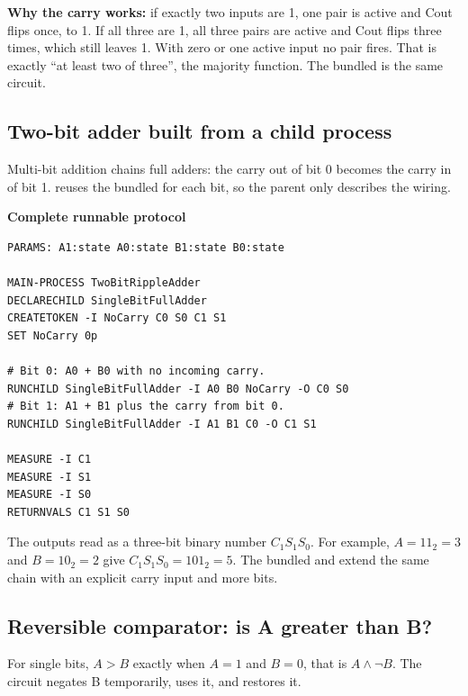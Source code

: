 \textbf{Why the carry works:} if exactly two inputs are 1, one pair is active
and Cout flips once, to 1. If all three are 1, all three pairs are active and
Cout flips three times, which still leaves 1. With zero or one active input no
pair fires. That is exactly ``at least two of three'', the majority function.
The bundled  is the same circuit.

\subsection{Two-bit adder built from a child process}

Multi-bit addition chains full adders: the carry out of bit 0 becomes the
carry in of bit 1.  reuses the bundled 
for each bit, so the parent only describes the wiring.

\textbf{Complete runnable protocol}
\begin{lstlisting}
PARAMS: A1:state A0:state B1:state B0:state

MAIN-PROCESS TwoBitRippleAdder
DECLARECHILD SingleBitFullAdder
CREATETOKEN -I NoCarry C0 S0 C1 S1
SET NoCarry 0p

# Bit 0: A0 + B0 with no incoming carry.
RUNCHILD SingleBitFullAdder -I A0 B0 NoCarry -O C0 S0
# Bit 1: A1 + B1 plus the carry from bit 0.
RUNCHILD SingleBitFullAdder -I A1 B1 C0 -O C1 S1

MEASURE -I C1
MEASURE -I S1
MEASURE -I S0
RETURNVALS C1 S1 S0
\end{lstlisting}

The outputs read as a three-bit binary number $C_1S_1S_0$. For example,
$A=11_2=3$ and $B=10_2=2$ give $C_1S_1S_0=101_2=5$. The bundled
 and  extend the same chain with
an explicit carry input and more bits.

\subsection{Reversible comparator: is A greater than B?}

For single bits, $A>B$ exactly when $A=1$ and $B=0$, that is
$A\land\neg B$. The circuit negates B temporarily, uses it, and restores it.

